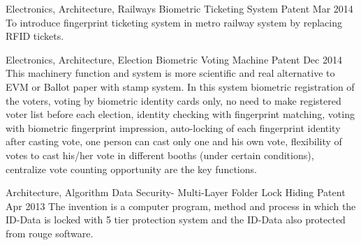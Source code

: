 \begin{cventries}
    \cventry
    {Electronics, Architecture, Railways}
    {Biometric Ticketing System}
    {Patent}
    {Mar 2014}
    {To introduce fingerprint ticketing system in metro railway system by replacing RFID tickets.}

    \cventry
    {Electronics, Architecture, Election}
    {Biometric Voting Machine}
    {Patent}
    {Dec 2014}
    {This machinery function and system is more scientific and real alternative to EVM or Ballot paper with stamp system. In this system
    biometric registration of the voters, voting by biometric identity cards only, no need to make registered voter list before each election,
    identity checking with fingerprint matching, voting with biometric fingerprint impression, auto-locking of each fingerprint identity after
    casting vote, one person can cast only one and his own vote, flexibility of votes to cast his/her vote in different booths (under certain
    conditions), centralize vote counting opportunity are the key functions.}

    \cventry
    {Architecture, Algorithm}
    {Data Security- Multi-Layer Folder Lock Hiding}
    {Patent}
    {Apr 2013}
    {The invention is a computer program, method and process in which the ID-Data is locked with 5 tier protection system and the ID-Data
    also protected from rouge software.}

\end{cventries}